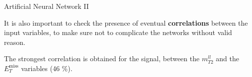 \documentclass[8 pt]{beamer}
\begin{document}
\begin{frame}{Artificial Neural Network II}

	\justifying 
	It is also important to check the presence of eventual \textbf{correlations} between the input variables, to make sure not to complicate the networks without valid reason. \vfill

\hspace{4pt}
   \begin{minipage}[c]{.02\linewidth}
	\begin{exampleblock}{}  \end{exampleblock}
   \end{minipage}	
   \hspace{5pt}
   \begin{minipage}[c]{.30\linewidth}
   \end{minipage} \hfill
   \begin{minipage}[c]{.30\linewidth}
   \end{minipage} \hfill
   \begin{minipage}[c]{.30\linewidth}
   	\justifying
	The strongest correlation is obtained for the signal, between the $m_{T2}^{ll}$ and the $E_T^{\text{miss}}$ variables (46 \%).
   \end{minipage} \hfill
   

\end{frame}
\end{document}
